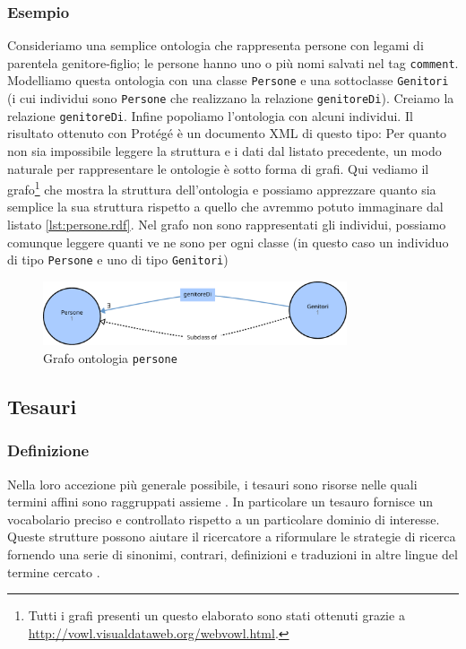\subsubsection{Esempio}
Consideriamo una semplice ontologia che rappresenta persone con legami di parentela genitore-figlio; le persone hanno uno o più nomi salvati nel tag \verb|comment|. Modelliamo questa ontologia con una classe \verb|Persone| e una sottoclasse \verb|Genitori| (i cui individui sono \verb|Persone| che realizzano la relazione \verb|genitoreDi|). Creiamo la relazione \verb|genitoreDi|. Infine popoliamo l'ontologia con alcuni individui. Il risultato ottenuto con Protégé è un documento XML di questo tipo:
Per quanto non sia impossibile leggere la struttura e i dati dal listato precedente, un modo naturale per rappresentare le ontologie è sotto forma di grafi. Qui vediamo il grafo\footnote{Tutti i grafi presenti un questo elaborato sono stati ottenuti grazie a \url{http://vowl.visualdataweb.org/webvowl.html}.} che mostra la struttura dell'ontologia e possiamo apprezzare quanto sia semplice la sua struttura rispetto a quello che avremmo potuto immaginare dal listato \ref{lst:persone.rdf}. Nel grafo non sono rappresentati gli individui, possiamo comunque leggere quanti ve ne sono per ogni classe (in questo caso un individuo di tipo \verb|Persone| e uno di tipo \verb|Genitori|)
\begin{figure}[H]
	\centering
	\includegraphics[width=0.8\textwidth]{Picture/persone.rdf.pdf}
	\caption{Grafo ontologia \texttt{persone}}
\end{figure}


\subsection{Tesauri}
\subsubsection{Definizione}
Nella loro accezione più generale possibile, i tesauri sono risorse nelle quali termini affini sono raggruppati assieme \cite{kilgarriff2000s}. In particolare un tesauro fornisce un vocabolario preciso e controllato rispetto a un particolare dominio di interesse. Queste strutture possono aiutare il ricercatore a riformulare le strategie di ricerca fornendo una serie di sinonimi, contrari, definizioni e traduzioni in altre lingue del termine cercato \cite{srinivasan1992thesaurus}.

